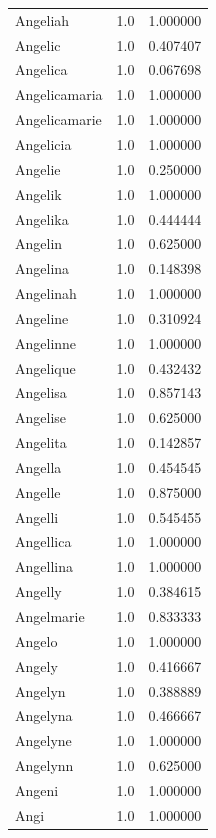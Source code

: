 \documentclass[
  letterpaper,
  DIV=11,
  numbers=noendperiod]{scrreprt}
\begin{document}
\begin{tabular}{lrr}
Angeliah        &   1.0 &   1.000000 \\
Angelic         &   1.0 &   0.407407 \\
Angelica        &   1.0 &   0.067698 \\
Angelicamaria   &   1.0 &   1.000000 \\
Angelicamarie   &   1.0 &   1.000000 \\
Angelicia       &   1.0 &   1.000000 \\
Angelie         &   1.0 &   0.250000 \\
Angelik         &   1.0 &   1.000000 \\
Angelika        &   1.0 &   0.444444 \\
Angelin         &   1.0 &   0.625000 \\
Angelina        &   1.0 &   0.148398 \\
Angelinah       &   1.0 &   1.000000 \\
Angeline        &   1.0 &   0.310924 \\
Angelinne       &   1.0 &   1.000000 \\
Angelique       &   1.0 &   0.432432 \\
Angelisa        &   1.0 &   0.857143 \\
Angelise        &   1.0 &   0.625000 \\
Angelita        &   1.0 &   0.142857 \\
Angella         &   1.0 &   0.454545 \\
Angelle         &   1.0 &   0.875000 \\
Angelli         &   1.0 &   0.545455 \\
Angellica       &   1.0 &   1.000000 \\
Angellina       &   1.0 &   1.000000 \\
Angelly         &   1.0 &   0.384615 \\
Angelmarie      &   1.0 &   0.833333 \\
Angelo          &   1.0 &   1.000000 \\
Angely          &   1.0 &   0.416667 \\
Angelyn         &   1.0 &   0.388889 \\
Angelyna        &   1.0 &   0.466667 \\
Angelyne        &   1.0 &   1.000000 \\
Angelynn        &   1.0 &   0.625000 \\
Angeni          &   1.0 &   1.000000 \\
Angi            &   1.0 &   1.000000 \\

\end{tabular}
\end{document}

